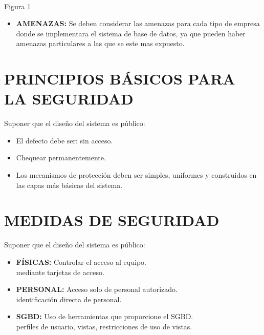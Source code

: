 \documentclass[conference]{IEEEtran}
\begin{document}
\\Figura 1

\begin{itemize}
\item \textbf{AMENAZAS:} Se deben considerar las amenazas para cada tipo de empresa donde se implementara el sistema de base de datos, ya que pueden haber amenazas particulares a las que se este mas expuesto.
\end{itemize}

\section{PRINCIPIOS BÁSICOS PARA LA SEGURIDAD}

Suponer que el diseño del sistema es público:
\begin{itemize}
\item \textbf{} El defecto debe ser: sin acceso.
\item \textbf{} Chequear permanentemente.
\item \textbf{} Los mecanismos de protección deben ser simples, uniformes y construidos en las capas más básicas del sistema.
\end{itemize}

\section{MEDIDAS DE SEGURIDAD}

Suponer que el diseño del sistema es público:
\begin{itemize}
\item \textbf{FÍSICAS:} Controlar el acceso al equipo.
\\
mediante tarjetas de acceso.
\item \textbf{PERSONAL:} Acceso solo de personal autorizado.
\\
identificación directa de personal.
\item \textbf{SGBD:} Uso de herramientas que proporcione el SGBD.
\\
perfiles de usuario, vistas, restricciones de uso de vistas.
\\
\end{itemize}
\\
\end{document}
